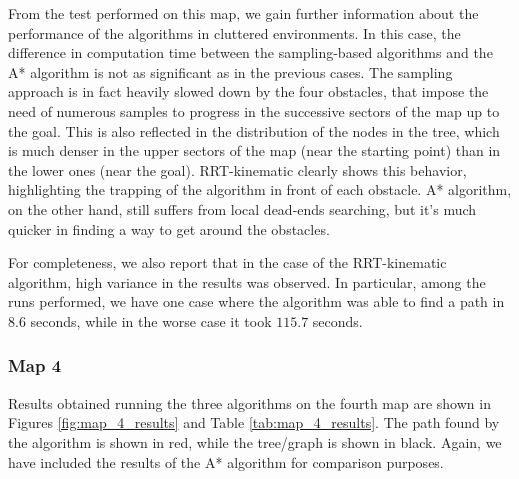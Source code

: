From the test performed on this map, we gain further information about the performance of the algorithms in cluttered environments.
In this case, the difference in computation time between the sampling-based algorithms and the A* algorithm is not as significant as in the previous cases.
The sampling approach is in fact heavily slowed down by the four obstacles, that impose the need of numerous samples to progress in the successive sectors of the map up to the goal.
This is also reflected in the distribution of the nodes in the tree, which is much denser in the upper sectors of the map (near the starting point) than in the lower ones (near the goal).
RRT-kinematic clearly shows this behavior, highlighting the trapping of the algorithm in front of each obstacle.
A* algorithm, on the other hand, still suffers from local dead-ends searching, but it's much quicker in finding a way to get around the obstacles.

For completeness, we also report that in the case of the RRT-kinematic algorithm, high variance in the results was observed.
In particular, among the runs performed, we have one case where the algorithm was able to find a path in $8.6$ seconds, while in the worse case it took $115.7$ seconds.



\subsubsection{Map 4}
\label{subsec:map_4}

Results obtained running the three algorithms on the fourth map are shown in Figures \ref{fig:map_4_results} and Table \ref{tab:map_4_results}.
The path found by the algorithm is shown in red, while the tree/graph is shown in black.
Again, we have included the results of the A* algorithm for comparison purposes.

